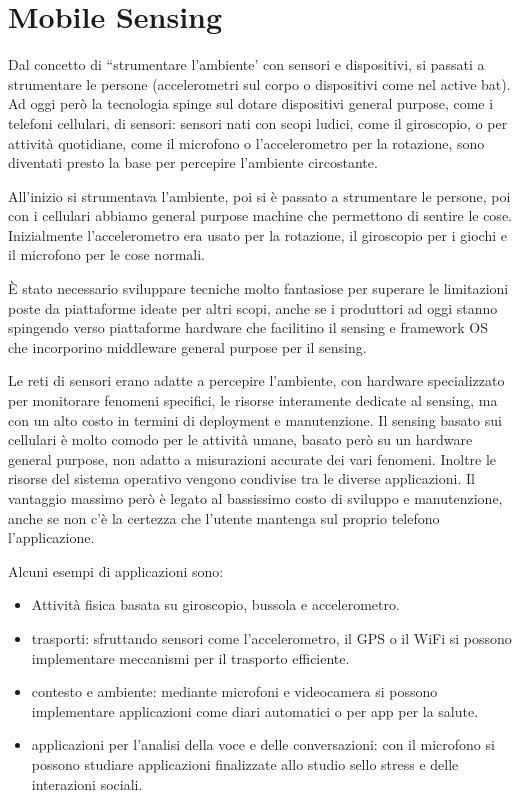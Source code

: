 \chapter{Mobile Sensing}
Dal concetto di ``strumentare l'ambiente' con sensori e dispositivi, si passati a
strumentare le persone (accelerometri sul corpo o dispositivi come nel active
bat). Ad oggi però la tecnologia spinge sul dotare dispositivi general purpose,
come i telefoni cellulari, di sensori: sensori nati con scopi ludici, come il
giroscopio, o per attività quotidiane, come il microfono o l'accelerometro per
la rotazione, sono diventati presto la base per percepire l'ambiente
circostante.

All'inizio si strumentava l'ambiente, poi si è passato a strumentare le persone,
poi con i cellulari abbiamo general purpose machine che permettono di sentire le
cose. Inizialmente l'accelerometro era usato per la rotazione, il giroscopio per
i giochi e il microfono per le cose normali.

È stato necessario sviluppare tecniche molto fantasiose per superare le
limitazioni poste da piattaforme ideate per altri scopi, anche se i produttori
ad oggi stanno spingendo verso piattaforme hardware che facilitino il sensing e
framework OS che incorporino middleware general purpose per il sensing.

Le reti di sensori erano adatte a percepire l'ambiente, con hardware
specializzato per monitorare fenomeni specifici, le risorse interamente dedicate
al sensing, ma con un alto costo in termini di deployment e manutenzione.
Il sensing basato sui cellulari è molto comodo per le attività umane, basato
però su un hardware general purpose, non adatto a misurazioni accurate dei vari
fenomeni. Inoltre le risorse del sistema operativo vengono condivise tra le
diverse applicazioni. Il vantaggio massimo però è legato al bassissimo costo di
sviluppo e manutenzione, anche se non c'è la certezza che l'utente mantenga sul
proprio telefono l'applicazione.

Alcuni esempi di applicazioni sono:
\begin{itemize}
\item Attività fisica basata su giroscopio, bussola e accelerometro.
\item trasporti: sfruttando sensori come l'accelerometro, il GPS o il WiFi si
possono implementare meccanismi per il trasporto efficiente.
\item contesto e ambiente: mediante microfoni e videocamera si possono
implementare applicazioni come diari automatici o per app per la salute.
\item applicazioni per l'analisi della voce e delle conversazioni: con il
microfono si possono studiare applicazioni finalizzate allo studio sello stress
e delle interazioni sociali.
\end{itemize}

